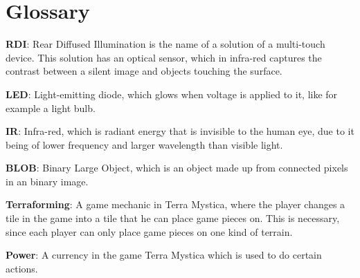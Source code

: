 \chapter*{Glossary}\label{gloss}

\textbf{RDI}: Rear Diffused Illumination is the name of a solution of a multi-touch device\citep{multiTT}. This solution has an optical sensor, which in infra-red captures the contrast between a silent image and objects touching the surface.

\textbf{LED}: Light-emitting diode, which glows when voltage is applied to it, like for example a light bulb.

\textbf{IR}: Infra-red, which is radiant energy that is invisible to the human eye, due to it being of lower frequency and larger wavelength than visible light.

\textbf{BLOB}: Binary Large Object, which is an object made up from connected pixels in an binary image. 

\textbf{Terraforming}: A game mechanic in Terra Mystica, where the player changes a tile in the game into a tile that he can place game pieces on. This is necessary, since each player can only place game pieces on one kind of terrain.

\textbf{Power}: A currency in the game Terra Mystica which is used to do certain actions.